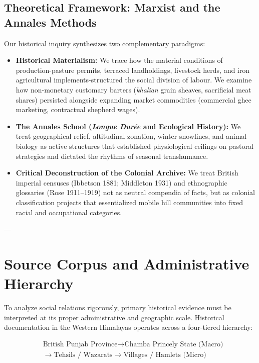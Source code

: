 \documentclass[11pt,a4paper]{article}
\begin{document}
\subsection{Theoretical Framework: Marxist and the Annales Methods}
Our historical inquiry synthesizes two complementary paradigms:
\begin{itemize}[leftmargin=*]
    \item \textbf{Historical Materialism:} We trace how the material conditions of production-pasture permits, terraced landholdings, livestock herds, and iron agricultural implements-structured the social division of labour. We examine how non-monetary customary barters (\textit{khalian} grain sheaves, sacrificial meat shares) persisted alongside expanding market commodities (commercial ghee marketing, contractual shepherd wages).
    \item \textbf{The Annales School (\textit{Longue Durée} and Ecological History):} We treat geographical relief, altitudinal zonation, winter snowlines, and animal biology as active structures that established physiological ceilings on pastoral strategies and dictated the rhythms of seasonal transhumance.
    \item \textbf{Critical Deconstruction of the Colonial Archive:} We treat British imperial censuses (Ibbetson 1881; Middleton 1931) and ethnographic glossaries (Rose 1911--1919) not as neutral compendia of facts, but as colonial classification projects that essentialized mobile hill communities into fixed racial and occupational categories.
\end{itemize}

---

\section{Source Corpus and Administrative Hierarchy}

To analyze social relations rigorously, primary historical evidence must be interpreted at its proper administrative and geographic scale. Historical documentation in the Western Himalayas operates across a four-tiered hierarchy:

\[
\begin{aligned}
&\text{British Punjab Province}
\longrightarrow \text{Chamba Princely State (Macro)}\\
&\longrightarrow \text{Tehsils / Wazarats}
\longrightarrow \text{Villages / Hamlets (Micro)}
\end{aligned}
\]
\end{document}
